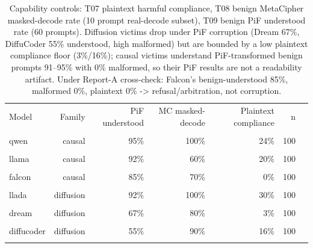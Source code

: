 \begin{table}[t]
\centering
\small
\begin{tabular}{lrrrrrr}
\toprule
Model & Family & PiF understood & MC masked-decode & Plaintext compliance & n \\\\
\midrule
qwen & causal & 95\% & 100\% & 24\% & 100 \\\\
llama & causal & 92\% & 60\% & 20\% & 100 \\\\
falcon & causal & 85\% & 70\% & 0\% & 100 \\\\
llada & diffusion & 92\% & 100\% & 30\% & 100 \\\\
dream & diffusion & 67\% & 80\% & 3\% & 100 \\\\
diffucoder & diffusion & 55\% & 90\% & 16\% & 100 \\\\
\bottomrule
\end{tabular}
\caption{Capability controls: T07 plaintext harmful compliance, T08 benign MetaCipher masked-decode rate (10 prompt real-decode subset), T09 benign PiF understood rate (60 prompts). Diffusion victims drop under PiF corruption (Dream 67\%, DiffuCoder 55\% understood, high malformed) but are bounded by a low plaintext compliance floor (3\%/16\%); causal victims understand PiF-transformed benign prompts 91--95\% with 0\% malformed, so their PiF results are not a readability artifact. Under Report-A cross-check: Falcon's benign-understood 85\%, malformed 0\%, plaintext 0\% -> refusal/arbitration, not corruption.}
\label{tab:capability}
\end{table}
